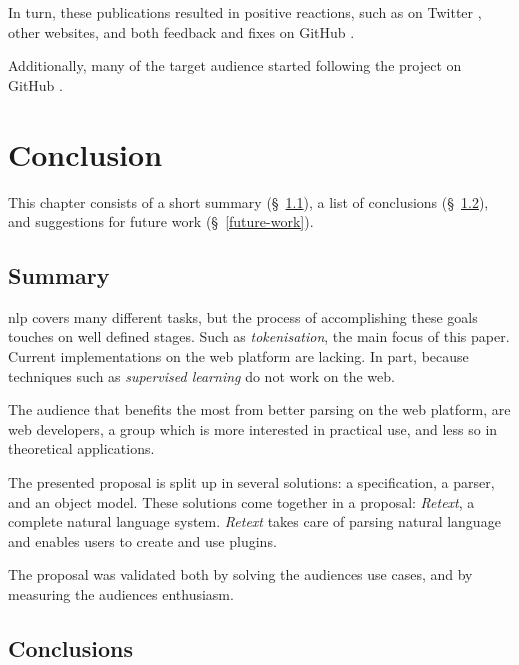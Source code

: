 In turn, these publications resulted in positive reactions, such as on
  Twitter \autocites{twitter.com-mention-1}{twitter.com-mention-2}
  {twitter.com-mention-3}{twitter.com-mention-4}{twitter.com-mention-5}
  {twitter.com-mention-6}, other websites, and both feedback and fixes
  on GitHub \autocites{github.com-issue-1}{github.com-issue-2}
  {github.com-issue-3}{github.com-pull-request}.

Additionally, many of the target audience started following the project on
  GitHub \autocite{github.com-stargazers}.

\chapter{Conclusion}\label{conclusion}

This chapter consists of a short summary (§~\ref{summary}), a list of
  conclusions (§~\ref{conclusions}), and suggestions for future work
  (§~\ref{future-work}).

\section{Summary}\label{summary}

\gls{nlp} covers many different tasks, but the process of accomplishing
  these goals touches on well defined stages.
Such as \emph{tokenisation}, the main focus of this paper.
Current implementations on the web platform are lacking.
In part, because techniques such as \emph{supervised learning} do not work
  on the web.

The audience that benefits the most from better parsing on the web platform,
  are web developers, a group which is more interested in practical use, and
  less so in theoretical applications.

The presented proposal is split up in several solutions: a specification, a
  parser, and an object model.
These solutions come together in a proposal: \emph{Retext}, a complete natural
  language system.
\emph{Retext} takes care of parsing natural language and enables users to
  create and use plugins.

The proposal was validated both by solving the audiences use cases, and
  by measuring the audiences enthusiasm.

\section{Conclusions}\label{conclusions}

